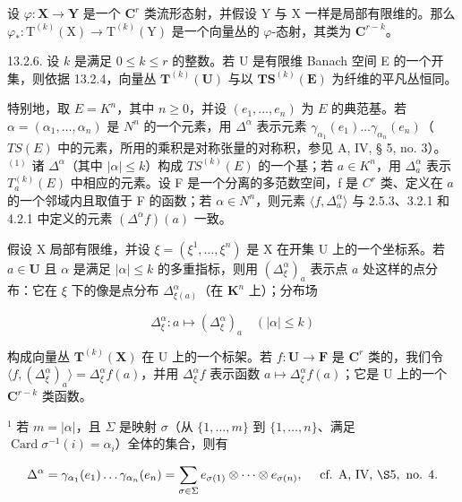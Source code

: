设 \(\varphi\colon\mathbf{X}\to\mathbf{Y}\) 是一个 \(\mathbf{C}^{r}\) 类流形态射，并假设 Y 与 X 一样是局部有限维的。那么 \(\varphi_{*}\colon\mathrm{T}^{(k)}(\mathrm{X})\to\mathrm{T}^{(k)}(\mathrm{Y})\) 是一个向量丛的 \(\varphi\)-态射，其类为 \(\mathbf{C}^{r-k}\)。

13.2.6. 设 \(k\) 是满足 \(0 \leqslant k \leqslant r\) 的整数。若 U 是有限维 Banach 空间 E 的一个开集，则依据 13.2.4，向量丛 \(\mathbf{T}^{(k)}(\mathbf{U})\) 与以 \(\mathbf{TS}^{(k)}(\mathbf{E})\) 为纤维的平凡丛恒同。

特别地，取 \(E = K^n\)，其中 \(n \geqslant 0\)，并设 \((e_1, \ldots, e_n)\) 为 \(E\) 的典范基。若 \(\alpha = (\alpha_1, \ldots, \alpha_n)\) 是 \(N^n\) 的一个元素，用 \(\Delta^\alpha\) 表示元素 \(\gamma_{\alpha_1}(e_1) \ldots \gamma_{\alpha_n}(e_n)\)（\(TS(E)\) 中的元素，所用的乘积是对称张量的对称积，参见 A, IV, § 5, no. 3）。\(^{(1)}\) 诸 \(\Delta^\alpha\)（其中 \(|\alpha| \leqslant k\)）构成 \(TS^{(k)}(E)\) 的一个基；若 \(a \in K^n\)，用 \(\Delta_a^\alpha\) 表示 \(T_a^{(k)}(E)\) 中相应的元素。设 F 是一个分离的多范数空间，f 是 \(C^r\) 类、定义在 \(a\) 的一个邻域内且取值于 F 的函数；若 \(\alpha \in N^n\)，则元素 \(\langle f, \Delta_a^\alpha \rangle\) 与 2.5.3、3.2.1 和 4.2.1 中定义的元素 \((\Delta^\alpha f)(a)\) 一致。

假设 X 局部有限维，并设 \(\xi = (\xi^1, \ldots, \xi^n)\) 是 X 在开集 U 上的一个坐标系。若 \(a \in \mathbf{U}\) 且 \(\alpha\) 是满足 \(|\alpha| \leqslant k\) 的多重指标，则用 \((\Delta_{\xi}^{\alpha})_a\) 表示点 \(a\) 处这样的点分布：它在 \(\xi\) 下的像是点分布 \(\Delta_{\xi(a)}^{\alpha}\)（在 \(\mathbf{K}^n\) 上）；分布场

\[
\Delta_ {\xi} ^ {\alpha}: a \mapsto (\Delta_ {\xi} ^ {\alpha}) _ {a} \quad (| \alpha | \leqslant k)
\]

构成向量丛 \(\mathbf{T}^{(k)}(\mathbf{X})\) 在 U 上的一个标架。若 \(f\colon \mathbf{U}\to \mathbf{F}\) 是 \(\mathbf{C}^r\) 类的，我们令 \(\langle f, (\Delta_{\xi}^{\alpha})_a\rangle = \Delta_{\xi}^{\alpha}f(a)\)，并用 \(\Delta_{\xi}^{\alpha}f\) 表示函数 \(a\mapsto \Delta_{\xi}^{\alpha}f(a)\)；它是 U 上的一个 \(\mathbf{C}^{r - k}\) 类函数。

\(^{1}\) 若 \(m = |\alpha|\)，且 \(\Sigma\) 是映射 \(\sigma\)（从 \(\{1, \ldots, m\}\) 到 \(\{1, \ldots, n\}\)、满足 \(\operatorname{Card}\sigma^{-1}(i)=\alpha_i\)）全体的集合，则有

\[
\Delta^ {\alpha} = \gamma_{\alpha_1}(e_1) \dots \gamma_{\alpha_n}(e_n) = \sum_{\sigma \in \Sigma} e_{\sigma(1)} \otimes \dots \otimes e_{\sigma(n)}, \quad \text { cf. A, IV, } \S 5, \text { no. } 4.
\]

